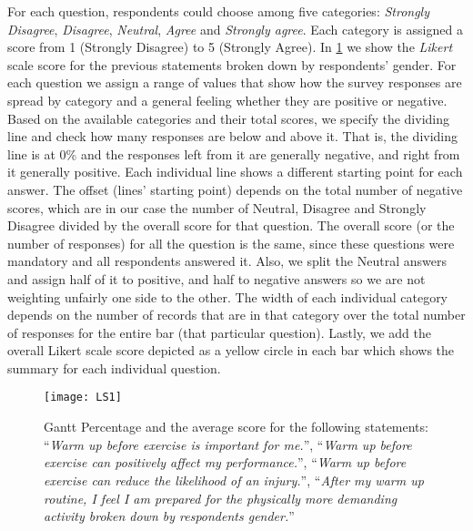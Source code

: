 For each question, respondents could choose among five categories: \textit{Strongly Disagree}, \textit{Disagree}, \textit{Neutral}, \textit{Agree} and \textit{Strongly agree}. Each category is assigned a score from 1 (Strongly Disagree) to 5 (Strongly Agree). In \ref{fig:LS1} we show the  
\textit{Likert} scale score for the previous statements broken down by respondents' gender. For each question we assign a range of values that show how the survey responses are spread by category and a general feeling whether they are positive or negative. Based on the available categories and their total scores, we specify the dividing line and check how many responses are below and above it. That is, the dividing line is at 0\% and the responses left from it are generally negative, and right from it generally positive.  Each individual line shows a different starting point for each answer. The offset (lines' starting point) depends on the total number of negative scores, which are in our case the number of Neutral, Disagree and Strongly Disagree divided by the overall score for that question. The overall score (or the number of responses) for all the question is the same, since these questions were mandatory and all respondents answered it. Also, we split the Neutral answers and assign half of it to positive, and half to negative answers so we are not weighting unfairly one side to the other.  The width of each individual category depends on the number of records that are in that category over the total number of responses for the entire bar (that particular question). Lastly, we add the overall Likert scale score depicted as a yellow circle in each bar which shows the summary for each individual question.  
\begin{figure}[h]
    \centering
    \texttt{[image: LS1]}
    \caption{Gantt Percentage and the average score for the following statements: ``\textit{Warm up before exercise is important for me.}'', ``\textit{Warm up before exercise can positively affect my performance.}'', ``\textit{Warm up before exercise can reduce the likelihood of an injury.}'', ``\textit{After my warm up routine, I feel I am prepared for the physically more demanding activity broken down by respondents gender.}''}
    \label{fig:LS1}
\end{figure}\\
